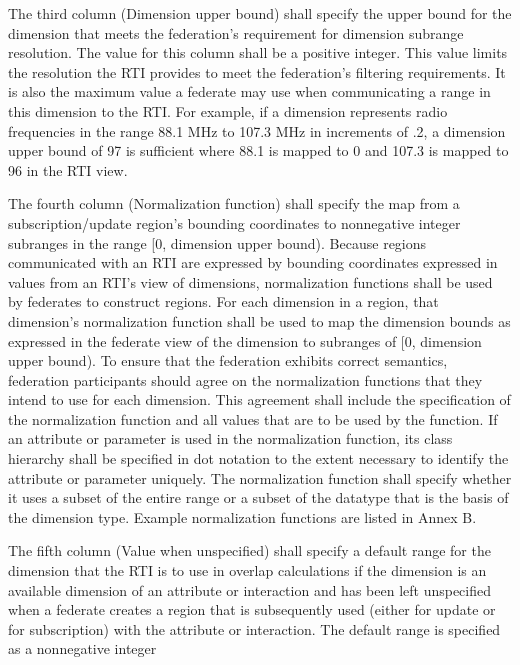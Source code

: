 The third column (Dimension upper bound) shall specify the upper bound for the dimension that meets the federation's requirement for dimension subrange resolution. The value for this column shall be a positive integer. This value limits the resolution the RTI provides to meet the federation's filtering requirements. It is also the maximum value a federate may use when communicating a range in this dimension to the RTI. For example, if a dimension represents radio frequencies in the range 88.1 MHz to 107.3 MHz in increments of .2, a dimension upper bound of 97 is sufficient where 88.1 is mapped to 0 and 107.3 is mapped to 96 in the RTI view.

The fourth column (Normalization function) shall specify the map from a subscription/update region's bounding coordinates to nonnegative integer subranges in the range [0, dimension upper bound). Because regions communicated with an RTI are expressed by bounding coordinates expressed in values from an RTI's view of dimensions, normalization functions shall be used by federates to construct regions. For each dimension in a region, that dimension's normalization function shall be used to map the dimension bounds as expressed in the federate view of the dimension to subranges of [0, dimension upper bound). To ensure that the federation exhibits correct semantics, federation participants should agree on the normalization functions that they intend to use for each dimension. This agreement shall include the specification of the normalization function and all values that are to be used by the function. If an attribute or parameter is used in the normalization function, its class hierarchy shall be specified in dot notation to the extent necessary to identify the attribute or parameter uniquely. The normalization function shall specify whether it uses a subset of the entire range or a subset of the datatype that is the basis of the dimension type. Example normalization functions are listed in Annex B.

The fifth column (Value when unspecified) shall specify a default range for the dimension that the RTI is to use in overlap calculations if the dimension is an available dimension of an attribute or interaction and has been left unspecified when a federate creates a region that is subsequently used (either for update or for subscription) with the attribute or interaction. The default range is specified as a nonnegative integer

